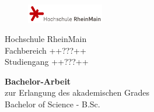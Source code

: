 \pagestyle{empty} %

\begin{figure}[t]
	\flushright
	\includegraphics[width=0.3\textwidth]{media/logo_hsrm}
\end{figure}


\begin{center}
Hochschule RheinMain \\
Fachbereich ++???++ \\
Studiengang ++???++

\vspace{30 pt}

{\Large \textbf{Bachelor-Arbeit}} \\
zur Erlangung des akademischen Grades \\ 
Bachelor of Science - B.Sc.

\vspace{50 pt}

\begin{spacing}{1.2}
\LARGE \textbf{\thetitle}
\end{spacing}
%
\end{center}

\vfill %

